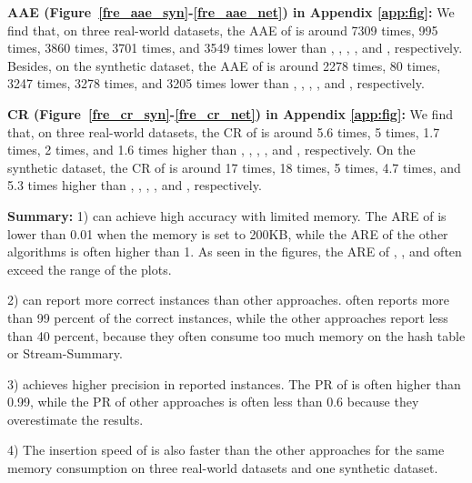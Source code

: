 \noindent\textbf{AAE (Figure~\ref{fre_aae_syn}-\ref{fre_aae_net}) in Appendix \ref{app:fig}:}
We find that, on three real-world datasets, the AAE of \sketchname{} is around 7309 times, 995 times, 3860 times, 3701 times, and 3549 times lower than \freCM, \freCU, \freCF, \freSS{}, and \freunbia{}, respectively. Besides, on the synthetic dataset, the AAE of \sketchname{} is around 2278 times, 80 times, 3247 times, 3278 times, and 3205 times lower than \freCM, \freCU, \freCF, \freSS{}, and \freunbia{}, respectively. 





\noindent\textbf{CR (Figure~\ref{fre_cr_syn}-\ref{fre_cr_net}) in Appendix \ref{app:fig}:}
We find that, on three real-world datasets, the CR of \sketchname{} is around 5.6 times, 5 times, 1.7 times, 2 times, and 1.6 times higher than \freCM, \freCU, \freCF, \freSS{}, and \freunbia{}, respectively. 
On the synthetic dataset, the CR of \sketchname{} is around 17 times, 18 times, 5 times, 4.7 times, and 5.3 times higher than \freCM, \freCU, \freCF, \freSS{}, and \freunbia{}, respectively.


\noindent\textbf{Summary:}
%
1) \sketchname{} can achieve high accuracy with limited memory. The ARE of \sketchname{} is lower than 0.01 when the memory is set to 200KB, while the ARE of the other algorithms is often higher than 1. As seen in the figures, the ARE of \freSS, \freCF{}, and \freunbia{} often exceed the range of the plots.

2) \sketchname{} can report more correct instances than other approaches. \sketchname{} often reports more than 99 percent of the correct instances, while the other approaches report less than 40 percent, because they often consume too much memory on the hash table or Stream-Summary.

3) \sketchname{} achieves higher precision in reported instances. The PR of \sketchname{} is often higher than 0.99, while the PR of other approaches is often less than 0.6 because they overestimate the results. 

4) The insertion speed of \sketchname{} is also faster than the other approaches for the same memory consumption on three real-world datasets and one synthetic dataset.